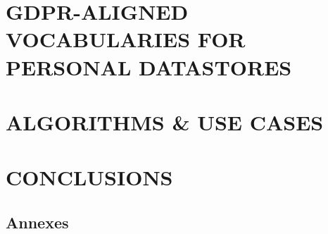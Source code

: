 \documentclass[
A4paper,                %
twoside,                %
openright,              %
chapterprefix=true,     %
12pt,                   %
headings=normal,        %
titlepage=on            %
]{book}
\begin{document}
\part{GDPR-ALIGNED VOCABULARIES FOR PERSONAL DATASTORES}




\part{ALGORITHMS \& USE CASES}




\part{CONCLUSIONS}



\cleardoublepage

\backmatter


\appendix
\chapter{Annexes}  

\end{document}

